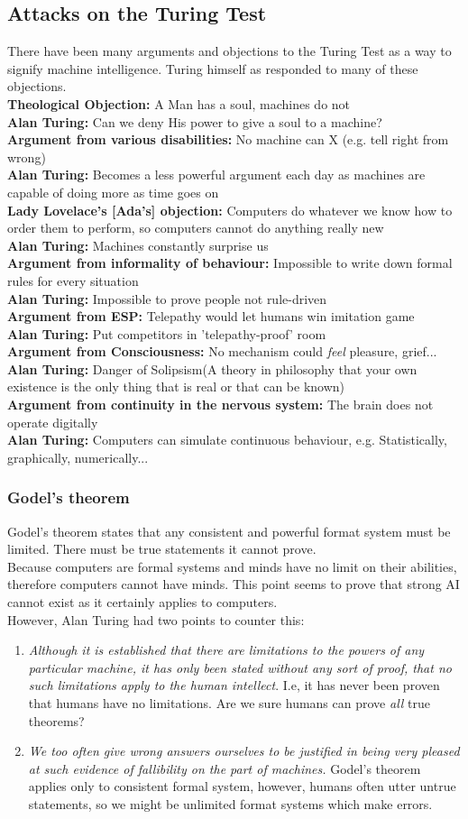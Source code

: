 \documentclass{article}
\newcommand{\n}[0]{\\[\baselineskip]}
\newcommand{\argument}[4]{\textbf{#1:} #2 \\ \textbf{#3:} #4}
\begin{document}
\subsection{Attacks on the Turing Test}
There have been many arguments and objections to the Turing Test as a way to signify machine intelligence. Turing himself as responded to many of these objections.
\n
\argument{Theological Objection}{A Man has a soul, machines do not}{Alan Turing}{Can we deny His power to give a soul to a machine?}
\n
\argument{Argument from various disabilities}{No machine can X (e.g. tell right from wrong)}{Alan Turing}{Becomes a less powerful argument each day as machines are capable of doing more as time goes on}
\n
\argument{Lady Lovelace's [Ada's] objection}{Computers do whatever we know how to order them to perform, so computers cannot do anything really new}{Alan Turing}{Machines constantly surprise us}
\n
\argument{Argument from informality of behaviour}{Impossible to write down formal rules for every situation}{Alan Turing}{Impossible to prove people not rule-driven}
\n
\argument{Argument from ESP}{Telepathy would let humans win imitation game}{Alan Turing}{Put competitors in 'telepathy-proof' room}
\n
\argument{Argument from Consciousness}{No mechanism could \textit{feel} pleasure, grief...}{Alan Turing}{Danger of Solipsism(A theory in philosophy that your own existence is the only thing that is real or that can be known)}
\n
\argument{Argument from continuity in the nervous system}{The brain does not operate digitally}{Alan Turing}{Computers can simulate continuous behaviour, e.g. Statistically, graphically, numerically...}
\subsubsection{Godel's theorem}
Godel's theorem states that any consistent and powerful format system must be limited. There must be true statements it cannot prove.
\n
Because computers are formal systems and minds have no limit on their abilities, therefore computers cannot have minds. This point seems to prove that strong AI cannot exist as it certainly applies to computers.
\n
However, Alan Turing had two points to counter this:
\begin{enumerate}
\item \textit{Although it is established that there are limitations to the powers of any particular machine, it has only been stated without any sort of proof, that no such limitations apply to the human intellect}. I.e, it has never been proven that humans have no limitations. Are we sure humans can prove \textit{all} true theorems?
\item \textit{We too often give wrong answers ourselves to be justified in being very pleased at such evidence of fallibility on the part of machines.} Godel's theorem applies only to consistent formal system, however, humans often utter untrue statements, so we might be unlimited format systems which make errors.
\end{enumerate}
\end{document}
